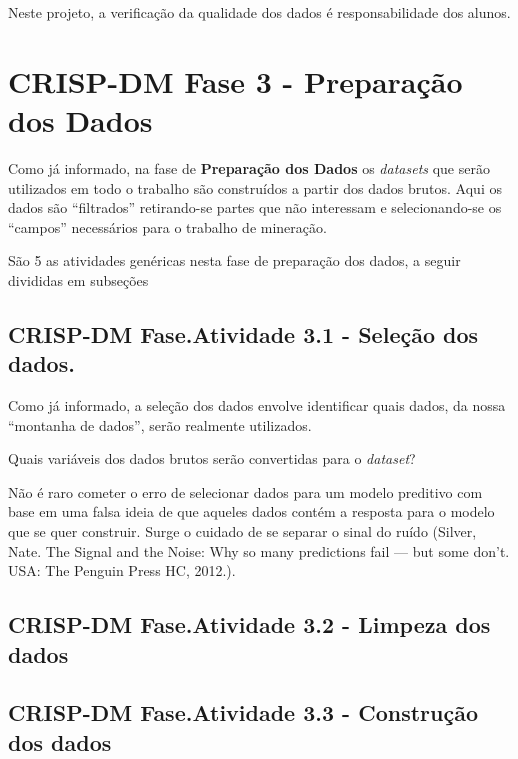\documentclass[]{article}
\begin{document}
Neste projeto, a verificação da qualidade dos dados é responsabilidade
dos alunos.

\section{\texorpdfstring{CRISP-DM Fase 3 - \textbf{Preparação dos
Dados}}{CRISP-DM Fase 3 - Preparação dos Dados}}\label{crisp-dm-fase-3---preparacao-dos-dados}

Como já informado, na fase de \textbf{Preparação dos Dados} os
\emph{datasets} que serão utilizados em todo o trabalho são construídos
a partir dos dados brutos. Aqui os dados são ``filtrados'' retirando-se
partes que não interessam e selecionando-se os ``campos'' necessários
para o trabalho de mineração.

São 5 as atividades genéricas nesta fase de preparação dos dados, a
seguir divididas em subseções

\subsection{CRISP-DM Fase.Atividade 3.1 - Seleção dos
dados.}\label{crisp-dm-fase.atividade-3.1---selecao-dos-dados.}

Como já informado, a seleção dos dados envolve identificar quais dados,
da nossa ``montanha de dados'', serão realmente utilizados.

Quais variáveis dos dados brutos serão convertidas para o
\emph{dataset}?

Não é raro cometer o erro de selecionar dados para um modelo preditivo
com base em uma falsa ideia de que aqueles dados contém a resposta para
o modelo que se quer construir. Surge o cuidado de se separar o sinal do
ruído (Silver, Nate. The Signal and the Noise: Why so many predictions
fail --- but some don't. USA: The Penguin Press HC, 2012.).

\subsection{CRISP-DM Fase.Atividade 3.2 - Limpeza dos
dados}\label{crisp-dm-fase.atividade-3.2---limpeza-dos-dados}

\subsection{CRISP-DM Fase.Atividade 3.3 - Construção dos
dados}\label{crisp-dm-fase.atividade-3.3---construcao-dos-dados}
\end{document}
